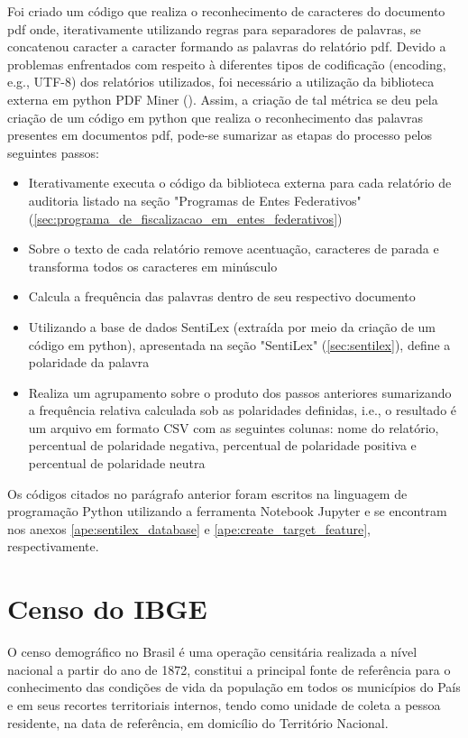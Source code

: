 Foi criado um código que realiza o reconhecimento de caracteres do documento pdf onde, iterativamente utilizando regras para separadores de palavras, se concatenou caracter a caracter formando as palavras do relatório pdf. Devido a problemas enfrentados com respeito à diferentes tipos de codificação (encoding, e.g., UTF-8) dos relatórios utilizados, foi necessário a utilização da biblioteca externa em python PDF Miner (\citet{PDFMiner}). Assim, a criação de tal métrica se deu pela criação de um código em python que realiza o reconhecimento das palavras presentes em documentos pdf, pode-se sumarizar as etapas do processo pelos seguintes passos:

\begin{itemize}
	\item Iterativamente executa o código da biblioteca externa para cada relatório de auditoria listado na seção "Programas de Entes Federativos" (\ref{sec:programa_de_fiscalizacao_em_entes_federativos})
	\item Sobre o texto de cada relatório remove acentuação, caracteres de parada e transforma todos os caracteres em minúsculo
	\item Calcula a frequência das palavras dentro de seu respectivo documento
	\item Utilizando a base de dados SentiLex (extraída por meio da criação de um código em python), apresentada na seção "SentiLex" (\ref{sec:sentilex}), define a polaridade da palavra
	\item Realiza um agrupamento sobre o produto dos passos anteriores sumarizando a frequência relativa calculada sob as polaridades definidas, i.e., o resultado é um arquivo em formato CSV com as seguintes colunas: nome do relatório, percentual de polaridade negativa, percentual de polaridade positiva e percentual de polaridade neutra
\end{itemize}

Os códigos citados no parágrafo anterior foram escritos na linguagem de programação Python utilizando a ferramenta Notebook Jupyter e se encontram nos anexos \ref{ape:sentilex_database} e \ref{ape:create_target_feature}, respectivamente.

\section{Censo do IBGE}
\label{sec:censo_do_ibge}

O censo demográfico no Brasil é uma operação censitária realizada a nível nacional a partir do ano de 1872, constitui a principal fonte de referência para o conhecimento das condições de vida da população em todos os municípios do País e em seus recortes territoriais internos, tendo como unidade de coleta a pessoa residente, na data de referência, em domicílio do Território Nacional.

